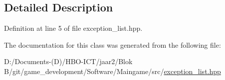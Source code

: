 \subsection{Detailed Description}


Definition at line 5 of file exception\+\_\+list.\+hpp.



The documentation for this class was generated from the following file\+:\begin{DoxyCompactItemize}
\item 
D\+:/\+Documents-\/(\+D)/\+H\+B\+O-\/\+I\+C\+T/jaar2/\+Blok B/git/game\+\_\+development/\+Software/\+Maingame/src/\hyperlink{exception__list_8hpp}{exception\+\_\+list.\+hpp}\end{DoxyCompactItemize}

